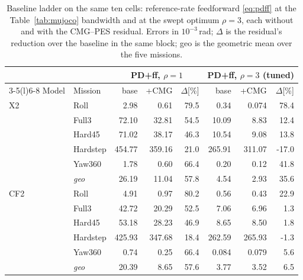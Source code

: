 \begin{table}[t]
\caption{Baseline ladder on the same ten cells: reference-rate feedforward \eqref{eq:pdff} at the Table~\ref{tab:mujoco} bandwidth and at the swept optimum $\rho=3$, each without and with the CMG--PES residual. Errors in $10^{-3}$\,rad; $\Delta$ is the residual's reduction over the baseline in the same block; geo is the geometric mean over the five missions.}
\label{tab:ladder}\centering\scriptsize
\setlength{\tabcolsep}{2.6pt}
\begin{tabular}{@{}llrrrrrr@{}}
\toprule
&&\multicolumn{3}{c}{PD+ff, $\rho=1$}&\multicolumn{3}{c}{PD+ff, $\rho=3$ (tuned)}\\
\cmidrule(lr){3-5}\cmidrule(l){6-8}
Model&Mission&base&+CMG&$\Delta$[\%]&base&+CMG&$\Delta$[\%]\\\midrule
X2&Roll&2.98&0.61&79.5&0.34&0.074&78.4\\
&Full3&72.10&32.81&54.5&10.09&8.83&12.4\\
&Hard45&71.02&38.17&46.3&10.54&9.08&13.8\\
&Hardstep&454.77&359.16&21.0&265.91&311.07&-17.0\\
&Yaw360&1.78&0.60&66.4&0.20&0.12&41.8\\
&\emph{geo}&26.19&11.04&57.8&4.54&2.93&35.6\\\midrule
CF2&Roll&4.91&0.97&80.2&0.56&0.43&22.9\\
&Full3&42.72&20.29&52.5&7.06&6.96&1.3\\
&Hard45&53.18&28.23&46.9&8.65&8.50&1.8\\
&Hardstep&425.93&347.68&18.4&262.59&265.93&-1.3\\
&Yaw360&0.74&0.25&66.4&0.084&0.079&5.6\\
&\emph{geo}&20.39&8.65&57.6&3.77&3.52&6.5\\\bottomrule
\end{tabular}
\end{table}
